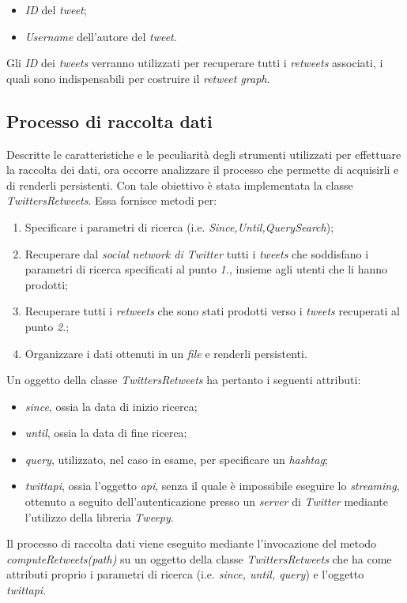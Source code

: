 \begin{itemize}
\item \textit{ID} del \textit{tweet};
\item \textit{Username} dell'autore del \textit{tweet}.
\end{itemize}
Gli \textit{ID} dei \textit{tweets} verranno utilizzati per recuperare tutti i \textit{retweets} associati, i quali sono indispensabili per costruire il \textit{retweet graph}.

\subsection{Processo di raccolta dati}
Descritte le caratteristiche e le peculiarità degli strumenti utilizzati per effettuare la raccolta dei dati, ora occorre analizzare il processo che permette di acquisirli e di renderli persistenti. Con tale obiettivo è stata implementata la classe \textit{TwittersRetweets}. Essa fornisce metodi per: 
\begin{enumerate}
\item Specificare i parametri di ricerca (i.e. \textit{Since,Until,QuerySearch}); 
\item Recuperare dal \textit{social network di Twitter} tutti i \textit{tweets} che soddisfano i parametri di ricerca specificati al punto \textit{1.}, insieme agli utenti che li hanno prodotti; 
\item Recuperare tutti i \textit{retweets} che sono stati prodotti verso i \textit{tweets} recuperati al punto \textit{2.};
\item Organizzare i dati ottenuti in un \textit{file} e renderli persistenti.
\end{enumerate}
Un oggetto della classe \textit{TwittersRetweets} ha pertanto i seguenti attributi:
\begin{itemize}
\item \textit{since}, ossia la data di inizio ricerca; 
\item \textit{until}, ossia la data di fine ricerca;
\item \textit{query}, utilizzato, nel caso in esame, per specificare un \textit{hashtag};
\item \textit{twittapi}, ossia l'oggetto \textit{api}, senza il quale è impossibile eseguire lo \textit{streaming}, ottenuto a seguito dell'autenticazione presso un \textit{server} di \textit{Twitter} mediante l'utilizzo della libreria \textit{Tweepy}.
\end{itemize}
Il processo di raccolta dati viene eseguito mediante l'invocazione del metodo \textit{computeRetweets(path)} su un oggetto della classe \textit{TwittersRetweets} che ha come attributi proprio i parametri di ricerca (i.e. \textit{since, until, query}) e l'oggetto \textit{twittapi}.
